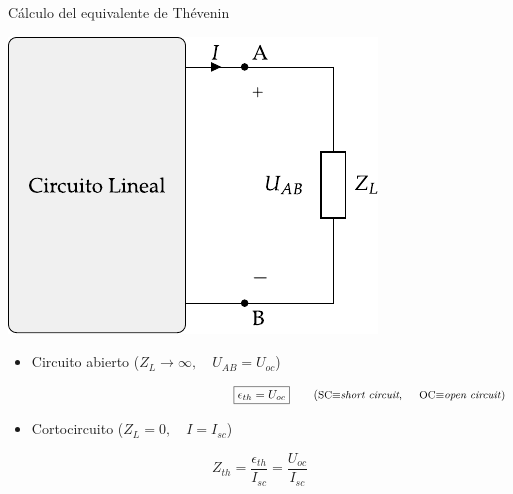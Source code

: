 \documentclass[aspectratio=169, usenames,svgnames,dvipsnames]{beamer}
\begin{document}
\begin{frame}{Cálculo del equivalente de Thévenin}
    \vspace{2mm}
    \begin{center}
        \includegraphics[height=0.43\textheight]{../figs/EquivalenteThevenin.pdf}
    \end{center}
    
    \begin{itemize}
        \item Circuito abierto (\(Z_L \to \infty, \quad U_{AB} = U_{oc}\))
    \end{itemize}
    
    \vspace{-5mm}
    \[
        \hspace{65mm}
        \boxed{\epsilon_{th} = U_{oc}} 
        \qquad \textrm{(\small{SC$\equiv$\textit{short circuit}, \hspace*{4mm}OC$\equiv$\textit{open circuit}})}
    \] 
    
    \vspace{-1mm}
    \begin{itemize}
        \item Cortocircuito (\(Z_L = 0, \quad I = I_{sc}\))
    \end{itemize}
    \[
        \boxed{Z_{th} = \frac{\epsilon_{th}}{I_{sc}} = \frac{U_{oc}}{I_{sc}}}
    \]
\end{frame}

\end{document}
